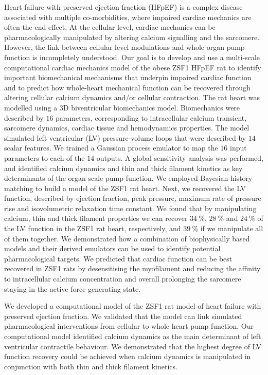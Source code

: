 \noindent
Heart failure with preserved ejection fraction (HFpEF) is a complex disease associated with multiple co-morbidities, where impaired cardiac mechanics are often the end effect. At the cellular level, cardiac mechanics can be pharmacologically manipulated by altering calcium signalling and the sarcomere. However, the link between cellular level modulations and whole organ pump function is incompletely understood. Our goal is to develop and use a multi-scale computational cardiac mechanics model of the obese ZSF1 HFpEF rat to identify important biomechanical mechanisms that underpin impaired cardiac function and to predict how whole-heart mechanical function can be recovered through altering cellular calcium dynamics and/or cellular contraction. The rat heart was modelled using a $3$D biventricular biomechanics model. Biomechanics were described by $16$ parameters, corresponding to intracellular calcium transient, sarcomere dynamics, cardiac tissue and hemodynamics properties. The model simulated left ventricular (LV) pressure-volume loops that were described by $14$ scalar features. We trained a Gaussian process emulator to map the $16$ input parameters to each of the $14$ outputs. A global sensitivity analysis was performed, and identified calcium dynamics and thin and thick filament kinetics as key determinants of the organ scale pump function. We employed Bayesian history matching to build a model of the ZSF1 rat heart. Next, we recovered the LV function, described by ejection fraction, peak pressure, maximum rate of pressure rise and isovolumetric relaxation time constant. We found that by manipulating calcium, thin and thick filament properties we can recover $\SI{34}{\percent}$, $\SI{28}{\percent}$ and $\SI{24}{\percent}$ of the LV function in the ZSF1 rat heart, respectively, and $\SI{39}{\percent}$ if we manipulate all of them together. We demonstrated how a combination of biophysically based models and their derived emulators can be used to identify potential pharmacological targets. We predicted that cardiac function can be best recovered in ZSF1 rats by desensitising the myofilament and reducing the affinity to intracellular calcium concentration and overall prolonging the sarcomere staying in the active force generating state.

\vspace{0.2cm}\noindent
{}

\noindent
We developed a computational model of the ZSF1 rat model of heart failure with preserved ejection fraction. We validated that the model can link simulated pharmacological interventions from cellular to whole heart pump function. Our computational model identified calcium dynamics as the main determinant of left ventricular contractile behaviour. We demonstrated that the highest degree of LV function recovery could be achieved when calcium dynamics is manipulated in conjunction with both thin and thick filament kinetics.

